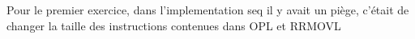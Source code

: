Pour le premier exercice, dans l'implementation seq il y avait un piège, c'était de changer la taille des instructions contenues dans OPL et RRMOVL